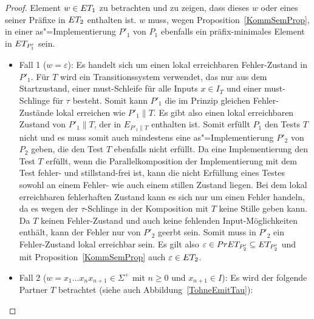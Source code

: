 \begin{proof}
  Element $w\in ET _1$ zu betrachten und zu zeigen, dass dieses $w$ oder eines
  seiner Präfixe in $ET _2$ enthalten ist. $w$ muss, wegen
  Proposition~\ref{KommSemProp}, in einer as"=Implementierung $P'_1$ von $P_1$
  ebenfalls ein präfix-minimales Element in $ET _{P'_1}$ sein.
  \begin{itemize}
    \item Fall 1 ($w=\varepsilon$): Es handelt sich um einen lokal erreichbaren
      Fehler-Zustand in $P'_1$. Für $T$ wird ein Transitionssystem verwendet,
      das nur aus dem Startzustand, einer must-Schleife für alle Inputs $x\in
      I_T$ und einer must-Schlinge für $\tau$ besteht. Somit kann $P'_1$ die im
      Prinzip gleichen Fehler-Zustände lokal erreichen wie $P'_1\|T$. Es gibt
      also einen lokal erreichbaren Zustand von $P'_1\|T$, der in $E_{P'_1\|T}$
      enthalten ist. Somit erfüllt $P_1$ den Tests $T$ nicht und es muss somit
      auch mindestens eine as"=Implementierung $P'_2$ von $P_2$ geben, die den
      Test $T$ ebenfalls nicht erfüllt. Da eine Implementierung den Test $T$
      erfüllt, wenn die Parallelkomposition der Implementierung mit dem Test
      fehler- und stillstand-frei ist, kann die nicht Erfüllung eines Testes
      sowohl an einem Fehler- wie auch einem stillen Zustand liegen. Bei dem
      lokal erreichbaren fehlerhaften Zustand kann es sich nur um einen Fehler
      handeln, da es wegen der $\tau$-Schlinge in der Komposition mit $T$ keine
      Stille geben kann. Da $T$ keinen Fehler-Zustand und auch keine fehlenden
      Input-Möglichkeiten enthält, kann der Fehler nur von $P'_2$ geerbt sein.
      Somit muss in $P'_2$ ein Fehler-Zustand lokal erreichbar sein. Es gilt
      also $\varepsilon \in PrET _{P'_2} \subseteq ET _{P'_2}$ und mit
      Proposition~\ref{KommSemProp} auch $\varepsilon\in ET _2$.
    \item Fall 2 ($w=x_1\dots x_n x_{n+1}\in\Sigma ^+$ mit $n\geq 0$ und
      $x_{n+1}\in I$): Es wird der folgende Partner $T$ betrachtet (siehe auch
      Abbildung~\ref{TohneEmitTau}):
\end{itemize}
\end{proof}
